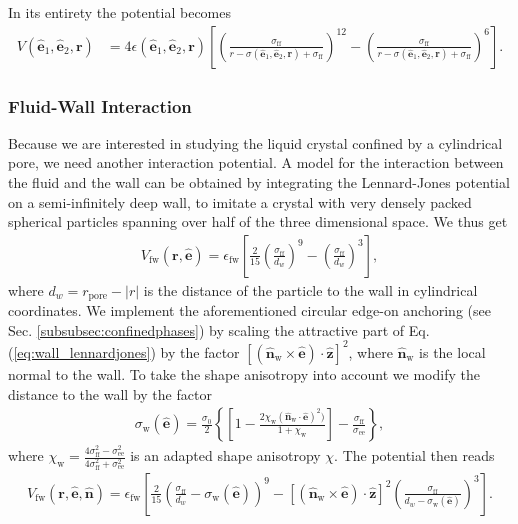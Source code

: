 In its entirety the potential becomes
\begin{align}
    \label{eq:GBDII}
    V(\mathbf{\hat{e}}_1,\mathbf{\hat{e}}_2,\mathbf{r}) &= 4\epsilon(\mathbf{\hat{e}}_1,\mathbf{\hat{e}}_2,\mathbf{r}) \left\lbrack \left(\frac{\sigma_{\text{ff}}}{r-\sigma(\mathbf{\hat{e}}_1,\mathbf{\hat{e}}_2,\mathbf{r})+\sigma_{\text{ff}}}\right)^{12}-\left(\frac{\sigma_{\text{ff}}}{r-\sigma(\mathbf{\hat{e}}_1,\mathbf{\hat{e}}_2,\mathbf{r})+\sigma_{\text{ff}}}\right)^{6} \right\rbrack.
\end{align}

\subsubsection{Fluid-Wall Interaction}
\label{subsubsec:fluidwallinteraction}
Because we are interested in studying the liquid crystal confined by a cylindrical pore, we need another interaction potential.
A model for the interaction between the fluid and the wall can be obtained by integrating the Lennard-Jones potential on a semi-infinitely deep wall, to imitate a crystal with very densely packed spherical particles spanning over half of the three dimensional space. We thus get
\begin{align}
    \label{eq:wall_lennardjones}
    V_{\text{fw}}(\mathbf{r},\mathbf{\hat{e}})= \epsilon_{\text{fw}} \left\lbrack \frac{2}{15} \left(\frac{\sigma_\text{ff}}{d_w}\right)^9 -  \left(\frac{\sigma_\text{ff}}{d_w}\right)^3 \right\rbrack,
\end{align}
where $d_w = r_{\text{pore}}-|r|$ is the distance of the particle to the wall in cylindrical coordinates.
We implement the aforementioned circular edge-on anchoring (see Sec. \ref{subsubsec:confinedphases}) by scaling the attractive part of Eq. (\ref{eq:wall_lennardjones}) by the factor $ \left[(\mathbf{\hat{n}}_\text{w} \times \mathbf{\hat{e}} )\cdot \mathbf{\hat{z}}\right]^2$, where $\mathbf{\hat{n}}_\text{w}$ is the local normal to the wall. To take the shape anisotropy into account we modify 
\cite{sentker2018quantized,caprion2009discotic} the distance to the wall by the factor
\begin{align}
    \sigma_\text{w} (\mathbf{\hat{e}}) = \frac{\sigma_0}{2} \left\{\left\lbrack 1 - \frac{2 \chi_\text{w} (\mathbf{\hat{n}}_\text{w} \cdot \mathbf{\hat{e}} )^2)}{1+\chi_\text{w}} \right\rbrack -\frac{\sigma_\text{ff}}{\sigma_\text{ee}} \right\},
\end{align}
where $\chi_{\text{w}} = \frac{4\sigma_\text{ff}^2-\sigma_\text{ee}^2}{4\sigma_\text{ff}^2+\sigma_\text{ee}^2}$ is an adapted shape anisotropy $\chi$.
The potential then reads
\begin{align}
    \label{eq:wall_pot}
    V_{\text{fw}}(\mathbf{r},\mathbf{\hat{e}},\mathbf{\hat{n}})= \epsilon_{\text{fw}} \left\lbrack \frac{2}{15} \left(\frac{\sigma_\text{ff}}{d_w}- \sigma_\text{w} (\mathbf{\hat{e}}) \right)^9 - \left[(\mathbf{\hat{n}}_\text{w} \times \mathbf{\hat{e}} )\cdot \mathbf{\hat{z}}\right]^2  \left(\frac{\sigma_\text{ff}}{d_w- \sigma_\text{w} (\mathbf{\hat{e}}) }\right)^3 \right\rbrack.
\end{align}

